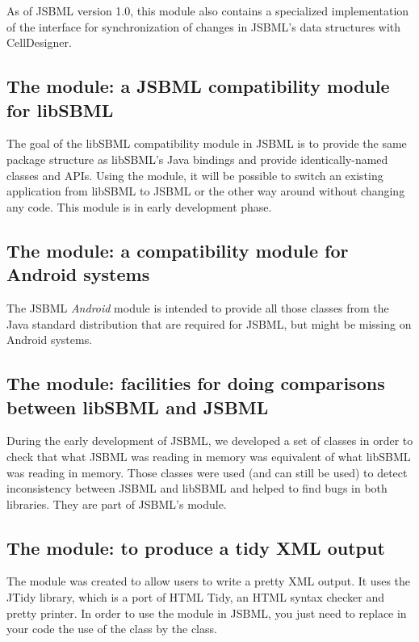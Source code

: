 As of JSBML version 1.0, this module also contains a specialized
implementation of the \TreeNodeChangeListener{} interface for
synchronization of changes in JSBML's data structures with CellDesigner.

\clearpage



\subsection{The  module: a JSBML compatibility
  module for libSBML}

The goal of the libSBML compatibility module in JSBML is to provide the
same package structure as libSBML's Java bindings and provide
identically-named classes and APIs. Using the module, it will be possible
to switch an existing application from libSBML to JSBML or the other way
around without changing any code.  %
This module is in early development phase.


\subsection{The  module: a compatibility module for
  Android systems}

The JSBML \emph{Android} module is intended to provide all those classes
from the Java standard distribution that are required for JSBML, but might
be missing on Android systems.


\subsection{The  module: facilities for doing comparisons between libSBML and JSBML}

During the early development of JSBML, we developed a set of classes in
order to check that what JSBML was reading in memory was equivalent of what
libSBML was reading in memory. Those classes were used (and can still be
used) to detect inconsistency between JSBML and libSBML and helped to find
bugs in both libraries.  They are part of JSBML's  module.


\subsection{The  module: to produce a tidy XML output}

The  module was created to allow users to write a pretty XML
output.  It uses the JTidy library, which is a port of HTML Tidy, an HTML
syntax checker and pretty printer.  In order to use the  module in
JSBML, you just need to replace in your code the use of the \SBMLWriter{}
class by the \TidySBMLWriter{} class.
